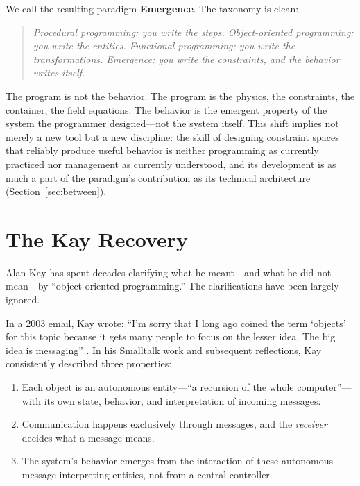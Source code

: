 \documentclass[11pt,twocolumn]{article}
\begin{document}
We call the resulting paradigm \textbf{Emergence}.  The taxonomy is
clean:

\begin{quote}
\emph{Procedural programming: you write the steps.
Object-oriented programming: you write the entities.
Functional programming: you write the transformations.
Emergence: you write the constraints, and the behavior writes
itself.}
\end{quote}

The program is not the behavior.  The program is the physics, the
constraints, the container, the field equations.  The behavior is the
emergent property of the system the programmer designed---not the system
itself.  This shift implies not merely a new tool but a new discipline:
the skill of designing constraint spaces that reliably produce useful
behavior is neither programming as currently practiced nor management as
currently understood, and its development is as much a part of the
paradigm's contribution as its technical architecture
(Section~\ref{sec:between}).

\section{The Kay Recovery}
\label{sec:kay}

Alan Kay has spent decades clarifying what he meant---and what he did
not mean---by ``object-oriented programming.''  The clarifications have
been largely ignored.

In a 2003 email, Kay wrote: ``I'm sorry that I long ago coined the term
`objects' for this topic because it gets many people to focus on the
lesser idea.  The big idea is messaging'' \citep{kay2003meaning}.  In
his Smalltalk work and subsequent reflections, Kay consistently
described three properties:

\begin{enumerate}[nosep]
  \item Each object is an autonomous entity---``a recursion of the whole
    computer''---with its own state, behavior, and interpretation of
    incoming messages.
  \item Communication happens exclusively through messages, and the
    \emph{receiver} decides what a message means.
  \item The system's behavior emerges from the interaction of these
    autonomous message-interpreting entities, not from a central
    controller.
\end{enumerate}
\end{document}

